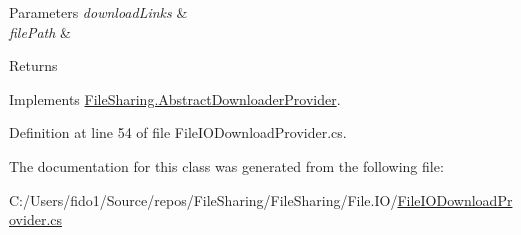 \begin{DoxyParams}{Parameters}
{\em download\+Links} & \\
\hline
{\em file\+Path} & \\
\hline
\end{DoxyParams}
\begin{DoxyReturn}{Returns}

\end{DoxyReturn}


Implements \hyperlink{class_file_sharing_1_1_abstract_downloader_provider_ada4a19b16867bad02c79f09072f69b84}{File\+Sharing.\+Abstract\+Downloader\+Provider}.



Definition at line 54 of file File\+I\+O\+Download\+Provider.\+cs.



The documentation for this class was generated from the following file\+:\begin{DoxyCompactItemize}
\item 
C\+:/\+Users/fido1/\+Source/repos/\+File\+Sharing/\+File\+Sharing/\+File.\+I\+O/\hyperlink{_file_i_o_download_provider_8cs}{File\+I\+O\+Download\+Provider.\+cs}\end{DoxyCompactItemize}
